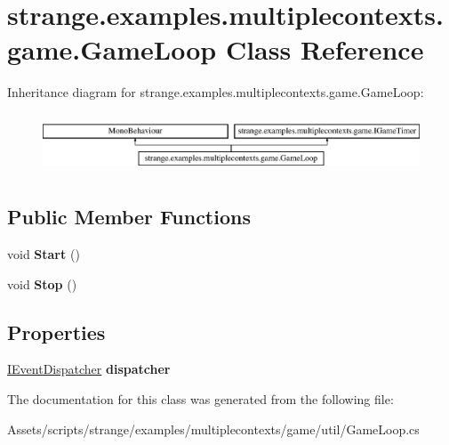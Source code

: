 \hypertarget{classstrange_1_1examples_1_1multiplecontexts_1_1game_1_1_game_loop}{\section{strange.\-examples.\-multiplecontexts.\-game.\-Game\-Loop Class Reference}
\label{classstrange_1_1examples_1_1multiplecontexts_1_1game_1_1_game_loop}
}
Inheritance diagram for strange.\-examples.\-multiplecontexts.\-game.\-Game\-Loop\-:\begin{figure}[H]
\begin{center}
\leavevmode
\includegraphics[height=1.783440cm]{classstrange_1_1examples_1_1multiplecontexts_1_1game_1_1_game_loop}
\end{center}
\end{figure}
\subsection*{Public Member Functions}
\begin{DoxyCompactItemize}
\item 
\hypertarget{classstrange_1_1examples_1_1multiplecontexts_1_1game_1_1_game_loop_aae5896de21699d0be8b67cbc2b2ccbac}{void {\bfseries Start} ()}\label{classstrange_1_1examples_1_1multiplecontexts_1_1game_1_1_game_loop_aae5896de21699d0be8b67cbc2b2ccbac}

\item 
\hypertarget{classstrange_1_1examples_1_1multiplecontexts_1_1game_1_1_game_loop_a1f3876aedaafa9bcdb5ff82f0a363b90}{void {\bfseries Stop} ()}\label{classstrange_1_1examples_1_1multiplecontexts_1_1game_1_1_game_loop_a1f3876aedaafa9bcdb5ff82f0a363b90}

\end{DoxyCompactItemize}
\subsection*{Properties}
\begin{DoxyCompactItemize}
\item 
\hypertarget{classstrange_1_1examples_1_1multiplecontexts_1_1game_1_1_game_loop_a46486f12a28051d381ff68d78f2e48a2}{\hyperlink{interfacestrange_1_1extensions_1_1dispatcher_1_1eventdispatcher_1_1api_1_1_i_event_dispatcher}{I\-Event\-Dispatcher} {\bfseries dispatcher}}\label{classstrange_1_1examples_1_1multiplecontexts_1_1game_1_1_game_loop_a46486f12a28051d381ff68d78f2e48a2}

\end{DoxyCompactItemize}


The documentation for this class was generated from the following file\-:\begin{DoxyCompactItemize}
\item 
Assets/scripts/strange/examples/multiplecontexts/game/util/Game\-Loop.\-cs\end{DoxyCompactItemize}
